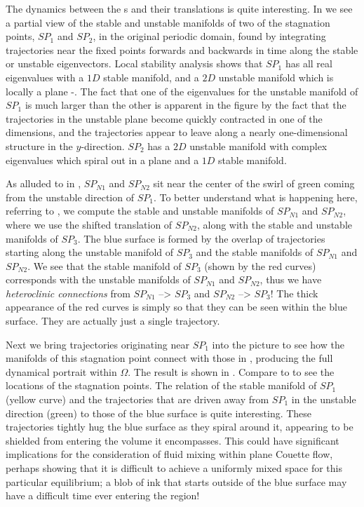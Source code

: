 \documentclass[letter,12pt,openany]{article}
\begin{document}
The dynamics between the \stagp s and their translations is
   quite interesting. In  we see a partial view of the stable and unstable manifolds of two of the stagnation points, $SP_1$ and $SP_2$, in the original periodic domain, found by integrating trajectories near the fixed points forwards and backwards in time along the stable or unstable eigenvectors. Local stability analysis shows that $SP_1$ has all real eigenvalues
with a $1D$ stable manifold,
and a $2D$ unstable manifold which is locally a plane -. The fact that one of the eigenvalues for the unstable manifold of $SP_1$ is much larger than the other is apparent in the figure by the fact that the trajectories in the unstable plane become quickly contracted in one of the dimensions, and the trajectories appear to leave along a nearly one-dimensional structure in the $y$-direction. $SP_2$
 has a $2D$ unstable manifold with complex eigenvalues which spiral
 out in a plane and a $1D$ stable manifold. 
 
 As alluded to in , $SP_{N1}$ and $SP_{N2}$ sit near the center of the swirl of green coming from the unstable direction of $SP_1$. To better understand what is happening here, referring to , we compute the  stable and unstable manifolds of $SP_{N1}$ and $SP_{N2}$, where we use the shifted translation of $SP_{N2}$, along with the stable and unstable manifolds of $SP_3$. The blue surface is formed by the overlap of trajectories starting along the unstable manifold of $SP_3$ and the stable manifolds of $SP_{N1}$ and $SP_{N2}$.  We see that the stable manifold of $SP_3$ (shown by the red curves) corresponds with the unstable manifolds of $SP_{N1}$ and $SP_{N2}$, thus we have \textit{heteroclinic connections} from $SP_{N1}$ --> $SP_3$ and $SP_{N2}$ --> $SP_3$!
 The thick appearance of the red curves
 is simply so that they can be seen within the blue surface. They are actually just a single trajectory.
 
 Next we bring trajectories originating near $SP_1$ into the picture to see how the manifolds of this stagnation point connect with those in , producing the full dynamical portrait within $\Omega$.  The result is
 shown in . Compare to  to see the locations of the stagnation points. The relation of the
 stable manifold of $SP_1$ (yellow curve) and the trajectories that are driven away from $SP_1$ in the unstable direction (green)
 to those of the blue surface is quite interesting. These trajectories
 tightly hug the blue surface as they spiral around it, appearing to be shielded from entering the volume it encompasses. This could have significant implications for the consideration of fluid mixing within plane Couette flow, perhaps showing that it is difficult to achieve a uniformly mixed space for this particular equilibrium; a blob of ink that starts outside of the blue surface may have a difficult time ever entering the region!
 
\end{document}
